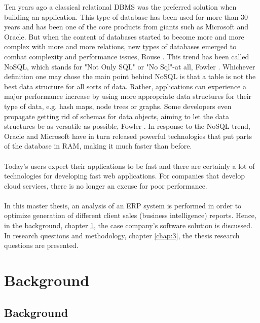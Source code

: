 \documentclass{cslthse-msc}
\begin{document}
Ten years ago a classical relational DBMS was the preferred solution when building an application. This type of database has been used for more than 30 years and has been one of the core products from giants such as Microsoft and Oracle. But when the content of databases started to become more and more complex with more and more relations, new types of databases emerged to combat complexity and performance issues, Rouse \cite{Rouse2011}. This trend has been called NoSQL, which stands for "Not Only SQL" or "No Sql"-at all, Fowler \cite{Fowler12}. Whichever definition one may chose the main point behind NoSQL is that a table is not the best data structure for all sorts of data. Rather, applications can experience a major performance increase by using more appropriate data structures for their type of data, e.g. hash maps, node trees or graphs. Some developers even propagate getting rid of schemas for data objects, aiming to let the data structures be as versatile as possible, Fowler \cite{Fowler12}. In response to the NoSQL trend, Oracle and Microsoft have in turn released powerful technologies that put parts of the database in RAM, making it much faster than before.\\\\
Today's users expect their applications to be fast and there are certainly a lot of technologies for developing fast web applications. For companies that develop cloud services, there is no longer an excuse for poor performance.\\\\
In this master thesis, an analysis of an ERP system is performed in order to optimize generation of different client sales (business intelligence) reports. Hence, in the background, chapter \ref{sec:background}, the case company's software solution is discussed. In research questions and methodology, chapter \ref{chap:3}, the thesis research questions are presented.

\chapter{Background}\label{sec:background}

\section{Background}
\end{document}
